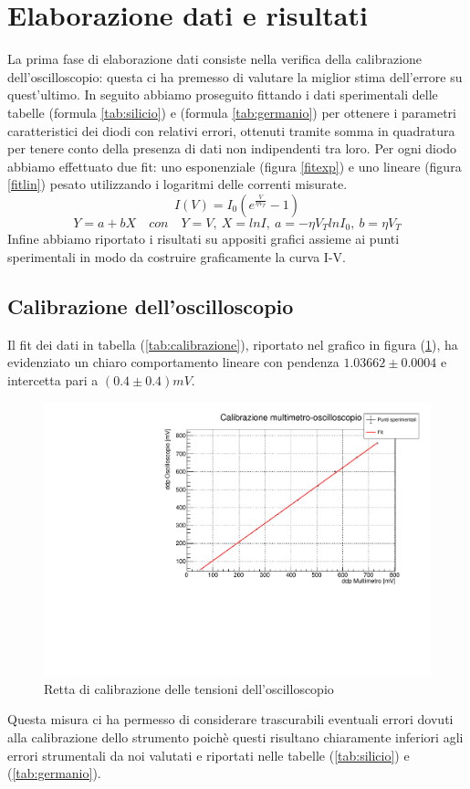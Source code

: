 \documentclass[]{article}
\begin{document}
\section{Elaborazione dati e risultati}

La prima fase di elaborazione dati consiste nella verifica della calibrazione dell'oscilloscopio: questa ci ha premesso di valutare la miglior stima dell'errore su quest'ultimo. In seguito abbiamo proseguito fittando i dati sperimentali delle tabelle (formula \ref{tab:silicio}) e (formula \ref{tab:germanio}) per ottenere i parametri caratteristici dei diodi con relativi errori, ottenuti tramite somma in quadratura per tenere conto della presenza di dati non indipendenti tra loro. Per ogni diodo abbiamo effettuato due fit: uno esponenziale (figura \ref{fitexp}) e uno lineare (figura \ref{fitlin}) pesato utilizzando i logaritmi delle correnti misurate.
\begin{equation}
	I(V)=I_0(e^{\frac{V}{\eta V_T}}-1)
	\label{fitexp}
\end{equation}
\begin{equation}
	Y=a+bX \quad con\quad Y=V,\: X=lnI, \:a=-\eta V_{T}lnI_{0},\: b=\eta V_{T}%
	\label{fitlin}
\end{equation}
Infine abbiamo riportato i risultati su appositi grafici assieme ai punti sperimentali in modo da costruire graficamente la curva I-V. 
  \subsection{Calibrazione dell'oscilloscopio}
Il fit dei dati in tabella (\ref{tab:calibrazione}), riportato nel grafico in figura (\ref{fig:calibrazione}), ha evidenziato un chiaro comportamento lineare con pendenza $1.03662\pm0.0004$ e intercetta pari a $(0.4\pm0.4)mV$.
\begin{figure}[H]
	\centering
	\includegraphics[width=0.4\linewidth]{../Silicio/Calibrazione}
	\caption{Retta di calibrazione delle tensioni dell'oscilloscopio}
	\label{fig:calibrazione}
\end{figure}
Questa misura ci ha permesso di considerare trascurabili eventuali errori dovuti alla calibrazione dello strumento poichè questi risultano chiaramente inferiori agli errori strumentali da noi valutati e riportati nelle tabelle (\ref{tab:silicio}) e (\ref{tab:germanio}).
\end{document}
